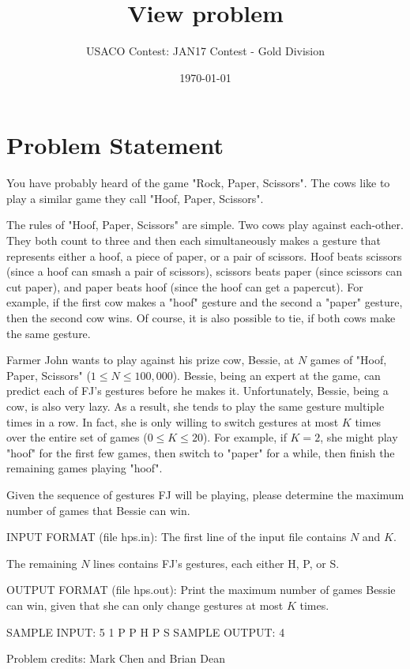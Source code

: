 \documentclass[12pt]{article}
\title{View problem}
\author{USACO Contest: JAN17 Contest - Gold Division}
\date{\today}
\begin{document}
\maketitle

\section*{Problem Statement}

You have probably heard of the game "Rock, Paper, Scissors".  The cows like to
play a similar game they call "Hoof, Paper, Scissors". 

The rules of "Hoof, Paper, Scissors" are simple.  Two cows play against
each-other.  They both count to three and then each simultaneously makes a
gesture that represents either a hoof, a piece of paper, or a pair of scissors. 
Hoof beats scissors (since a hoof can smash a pair of scissors), scissors beats
paper (since scissors can cut paper), and paper beats hoof (since the hoof can
get a papercut).   For example, if the first cow makes a "hoof" gesture and the
second a "paper" gesture, then the second cow wins.  Of course, it is also
possible to tie, if both cows make the same gesture.

Farmer John wants to play against his prize cow, Bessie, at $N$ games of  "Hoof,
Paper, Scissors" ($1 \leq N \leq 100,000$).  Bessie, being an expert at the
game, can predict each of FJ's gestures before he makes it.  Unfortunately,
Bessie, being a cow, is also very lazy.  As a result, she tends to play the same
gesture multiple times in a row.  In fact, she is only willing to switch
gestures at most $K$ times over the entire set of games ($0 \leq K \leq 20$).  
For example, if $K=2$, she might play
"hoof" for the first few games, then switch to "paper" for a while, then
finish the remaining games playing "hoof".

Given the sequence of gestures FJ will be playing, please determine the  maximum
number of games that Bessie can win.

INPUT FORMAT (file hps.in):
The first line of the input file contains $N$ and $K$. 

The remaining $N$ lines contains FJ's gestures, each either H, P, or S.

OUTPUT FORMAT (file hps.out):
Print the maximum number of games Bessie can win, given that she can only change
gestures at most $K$ times.

SAMPLE INPUT:
5 1
P
P
H
P
S
SAMPLE OUTPUT: 
4


Problem credits: Mark Chen and Brian Dean
\end{document}
